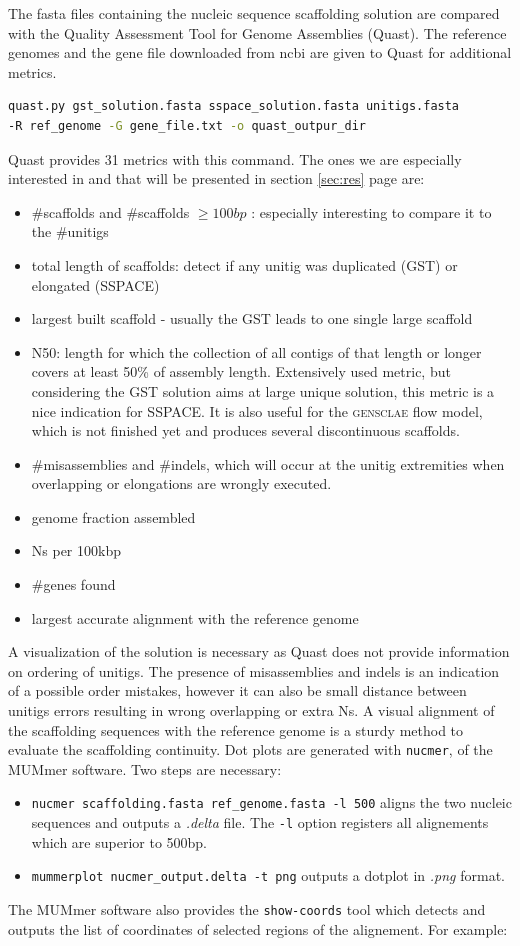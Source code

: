 \documentclass[12pt]{article}
\newcommand*{\fulleref}[1]{section \hyperref[{#1}] {\ref*{#1}} page {\pageref{#1}}}%
\begin{document}
The fasta files containing the nucleic sequence scaffolding solution are compared with the Quality Assessment Tool for Genome Assemblies (Quast). The reference genomes and the gene file downloaded from ncbi are given to Quast for additional metrics.
\begin{lstlisting}[language=bash]
quast.py gst_solution.fasta sspace_solution.fasta unitigs.fasta 
-R ref_genome -G gene_file.txt -o quast_outpur_dir
\end{lstlisting}
Quast provides 31 metrics with this command. The ones we are especially interested in and that will be presented in \fulleref{sec:res} are: 
\begin{itemize}
\item \#scaffolds and \#scaffolds $\geq 100bp$ : especially interesting to compare it to the \#unitigs
\item total length of scaffolds: detect if any unitig was duplicated (GST) or elongated (SSPACE)
\item largest built scaffold - usually the GST leads to one single large scaffold
\item N50:  length for which the collection of all contigs of that length or longer covers at least 50\% of assembly length. Extensively used metric, but considering the GST solution aims at large unique solution, this metric is a nice indication for SSPACE. It is also useful for the \textsc{gensclae} flow model, which is not finished yet and produces several discontinuous scaffolds.
\item \#misassemblies and \#indels, which will occur at the unitig extremities when overlapping or elongations are wrongly executed.
\item genome fraction assembled 
\item Ns per 100kbp
\item \#genes found
\item largest accurate alignment with the reference genome
\end{itemize}
A visualization of the solution is necessary as Quast does not provide information on ordering of unitigs. The presence of misassemblies and indels is an indication of a possible order mistakes, however it can also be small distance between unitigs errors resulting in wrong overlapping or extra Ns. A visual alignment of the scaffolding sequences with the reference genome is a sturdy method to evaluate the scaffolding continuity. Dot plots are generated with \texttt{nucmer}, of the MUMmer software. Two steps are necessary: 
\begin{itemize}
\item \texttt{nucmer scaffolding.fasta ref\_genome.fasta -l 500} aligns the two nucleic sequences and outputs a \textit{.delta} file. The \texttt{-l} option registers all alignements which are superior to 500bp.
\item \texttt{mummerplot nucmer\_output.delta -t png} outputs a dotplot in \textit{.png} format.
\end{itemize}
The MUMmer software also provides the \texttt{show-coords} tool which detects and outputs the list of coordinates of selected regions of the alignement. For example:
\end{document}
